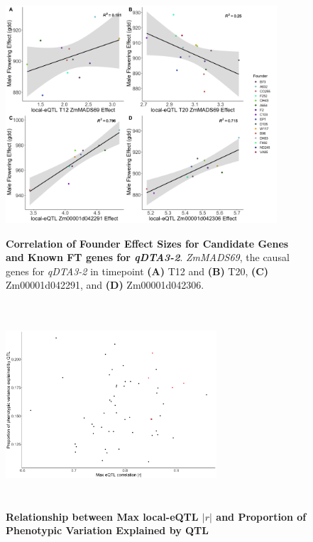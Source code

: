 \documentclass[article,9pt,twocolumn,twoside]{rilabRxiv}
\begin{document}
\begin{figure}[!ht]
\centering
\includegraphics[width=0.9\textwidth,height=3.5in]{figures/chapter2_figure6.png}
\caption{\textbf{Correlation of Founder Effect Sizes for Candidate Genes and Known FT genes for \textit{qDTA3-2}}. \textit{ZmMADS69}, the causal genes for \textit{qDTA3-2} in timepoint \textbf{(A)} T12  and \textbf{(B)} T20,
\textbf{(C)} Zm00001d042291, and \textbf{(D)} Zm00001d042306.}
\label{fig:chapter2_supfigure5}
\end{figure}

\begin{figure}[!ht]
\centering
\includegraphics[width=0.7\textwidth,height=3in]{figures/eQTL_r_by_QTL_propvar.png}
\caption{\textbf{Relationship between Max local-eQTL $|r|$ and Proportion of Phenotypic Variation Explained by QTL}}
\label{fig:chapter2_supfigure6}
\end{figure}
\end{document}
